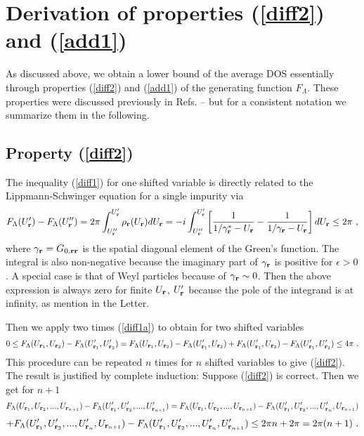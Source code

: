 \documentclass[aps]{revtex4}
\def\beq{\begin{equation}}
\def\eeq{\end{equation}}
\def\br{{\bf r}}
\begin{document}
\section{Derivation of properties (\ref{diff2}) and (\ref{add1})}
\label{sect:properties}

As discussed above, we obtain a lower bound of the average DOS essentially through properties  
(\ref{diff2}) and (\ref{add1}) of the generating function $F_\Lambda$.
These properties were discussed previously in Refs. \cite{ziegler87}--\cite{ziegler98}
but for a consistent notation we summarize them in the following. 


\subsection{Property (\ref{diff2})}

The inequality (\ref{diff1}) for one shifted variable is directly related to the Lippmann-Schwinger 
equation for a single impurity via
\beq
F_\Lambda(U_\br')-F_\Lambda(U_\br'') = 2\pi\int_{U_\br''}^{U_\br'} \rho_\br(U_\br)dU_\br
=-i\int_{U_\br''}^{U_\br'}
\left[\frac{1}{1/\gamma_\br^*-U_\br}-\frac{1}{1/\gamma_\br-U_\br}\right]dU_\br\le 2\pi
\ ,
\label{diff1a}
\eeq
where $\gamma_\br=G_{0,\br\br}$ is the spatial diagonal element of the Green's function. The integral 
is also non-negative because the imaginary part of $\gamma_\br$ is positive for $\epsilon>0$.
A special case is that of Weyl particles because of $\gamma_\br\sim 0$. Then the above expression is
always zero for finite $U_\br$, $U_\br'$ because the pole of the integrand is at infinity, as mention in
the Letter.

Then we apply two times (\ref{diff1a}) to obtain for two shifted variables 
\[
0\le F_\Lambda(U_{\br_1},U_{\br_2})-F_\Lambda(U_{\br_1}',U_{\br_2}')
= F_\Lambda(U_{\br_1},U_{\br_2})-F_\Lambda(U_{\br_1}',U_{\br_2})
+F_\Lambda(U_{\br_1}',U_{\br_2})-F_\Lambda(U_{\br_1}',U_{\br_2}')
\le 4\pi
\ .
\]
This procedure can be repeated $n$ times for $n$ shifted variables to give (\ref{diff2}). 
The result is justified by complete induction: Suppose (\ref{diff2}) is correct. Then we get for $n+1$
\[
F_\Lambda(U_{\br_1},U_{\br_2},...,U_{\br_{n+1}})-F_\Lambda(U_{\br_1}',U_{\br_2}',...,U_{\br_{n+1}}')
=F_\Lambda(U_{\br_1},U_{\br_2},...,U_{\br_{n+1}})-F_\Lambda(U_{\br_1}',U_{\br_2}',...,U_{\br_n}',U_{\br_{n+1}})
\]
\[
+F_\Lambda(U_{\br_1}',U_{\br_2}',...,U_{\br_n}',U_{\br_{n+1}})
-F_\Lambda(U_{\br_1}',U_{\br_2}',...,U_{\br_n}',U_{\br_{n+1}}')
\le 2\pi n +2\pi=2\pi(n+1)
\ .
\]
\end{document}
